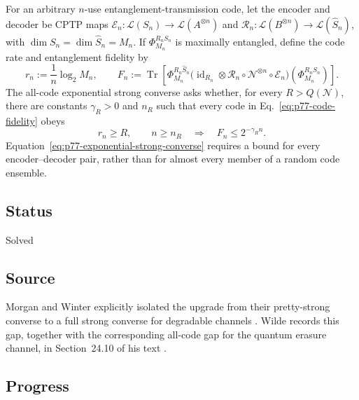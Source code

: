 For an arbitrary $n$-use entanglement-transmission code, let the encoder and
decoder be CPTP maps
$\mathcal E_n:\mathcal L(S_n)\to\mathcal L(A^{\otimes n})$ and
$\mathcal R_n:\mathcal L(B^{\otimes n})\to\mathcal L(\widehat S_n)$, with
$\dim S_n=\dim\widehat S_n=M_n$.  If
$\Phi_{M_n}^{R_nS_n}$ is maximally entangled, define the code rate and
entanglement fidelity by
\begin{equation}
  r_n:=\frac{1}{n}\log_2 M_n,
  \qquad
  F_n:=\operatorname{Tr}\!\left[
    \Phi_{M_n}^{R_n\widehat S_n}
    \bigl(\operatorname{id}_{R_n}\otimes
      \mathcal R_n\circ\mathcal N^{\otimes n}\circ\mathcal E_n\bigr)
      (\Phi_{M_n}^{R_nS_n})
  \right].
  \label{eq:p77-code-fidelity}
\end{equation}
The all-code exponential strong converse asks whether, for every
$R>Q(\mathcal N)$, there are constants $\gamma_R>0$ and $n_R$ such that every
code in Eq.~\eqref{eq:p77-code-fidelity} obeys
\begin{equation}
  r_n\geq R,\qquad n\geq n_R
  \quad\Longrightarrow\quad
  F_n\leq 2^{-\gamma_R n}.
  \label{eq:p77-exponential-strong-converse}
\end{equation}
Equation~\eqref{eq:p77-exponential-strong-converse} requires a bound for every
encoder--decoder pair, rather than for almost every member of a random code
ensemble.

\subsection*{Status}

Solved

\subsection*{Source}

Morgan and Winter explicitly isolated the upgrade from their pretty-strong
converse to a full strong converse for degradable channels
.  Wilde records this gap, together
with the corresponding all-code gap for the quantum erasure channel, in
Section~24.10 of his text .

\subsection*{Progress}

